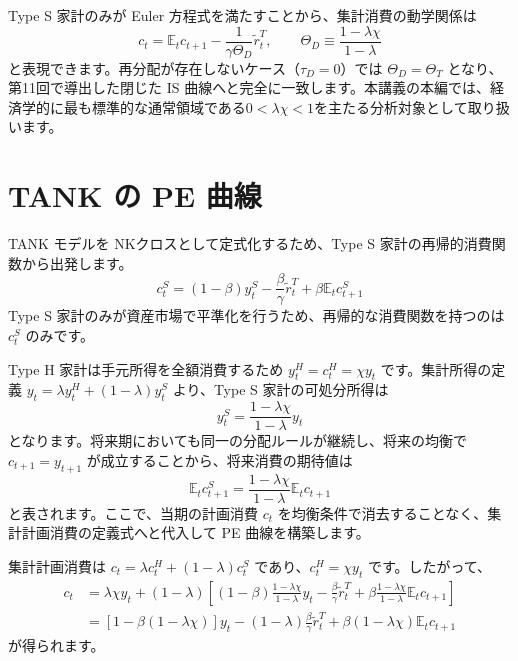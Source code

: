 \documentclass[
  japanese,
  lualatex,
  ja=standard,
  12pt,
  a4paper]{ltjsarticle}
\begin{document}

\begin{tcolorbox}[enhanced jigsaw, arc=.35mm, bottomrule=.15mm, bottomtitle=1mm, breakable, colback=white, colbacktitle=quarto-callout-note-color!10!white, colframe=quarto-callout-note-color-frame, coltitle=black, left=2mm, leftrule=.75mm, opacityback=0, opacitybacktitle=0.6, rightrule=.15mm, title=\textcolor{quarto-callout-note-color}{\faInfo}\hspace{0.5em}{第11回との接続と本編の標準領域}, titlerule=0mm, toprule=.15mm, toptitle=1mm]

Type S 家計のみが Euler 方程式を満たすことから、集計消費の動学関係は \[
c_t = \mathbb{E}_t c_{t+1} - \frac{1}{\gamma \Theta_D}\widetilde{r}_t^T, \qquad \Theta_D \equiv \frac{1 - \lambda\chi}{1-\lambda}
\] と表現できます。再分配が存在しないケース（\(\tau_D = 0\)）では
\(\Theta_D = \Theta_T\) となり、第11回で導出した閉じた IS
曲線へと完全に一致します。本講義の本編では、経済学的に最も標準的な通常領域である\textbf{\(0 < \lambda\chi < 1\)}を主たる分析対象として取り扱います。

\end{tcolorbox}

\section{TANK の PE 曲線}\label{tank-ux306e-pe-ux66f2ux7dda}

TANK モデルを NKクロスとして定式化するため、Type S
家計の再帰的消費関数から出発します。 \[
c_t^S = (1-\beta)y_t^S - \frac{\beta}{\gamma}\widetilde{r}_t^T + \beta \mathbb{E}_t c_{t+1}^S
\] Type S
家計のみが資産市場で平準化を行うため、再帰的な消費関数を持つのは
\(c_t^S\) のみです。

Type H 家計は手元所得を全額消費するため \(y_t^H = c_t^H = \chi y_t\)
です。集計所得の定義 \(y_t = \lambda y_t^H + (1-\lambda)y_t^S\)
より、Type S 家計の可処分所得は \[
y_t^S = \frac{1 - \lambda\chi}{1-\lambda} y_t
\] となります。将来期においても同一の分配ルールが継続し、将来の均衡で
\(c_{t+1} = y_{t+1}\) が成立することから、将来消費の期待値は \[
\mathbb{E}_t c_{t+1}^S = \frac{1 - \lambda\chi}{1-\lambda} \mathbb{E}_t c_{t+1}
\] と表されます。ここで、当期の計画消費 \(c_t\)
を均衡条件で消去することなく、集計計画消費の定義式へと代入して PE
曲線を構築します。

集計計画消費は \(c_t = \lambda c_t^H + (1-\lambda) c_t^S\)
であり、\(c_t^H = \chi y_t\) です。したがって、 \[
\begin{aligned}
c_t
&=
\lambda \chi y_t
+
(1-\lambda)
\left[
(1-\beta)\frac{1 - \lambda\chi}{1-\lambda} y_t
-
\frac{\beta}{\gamma}\widetilde{r}_t^T
+
\beta \frac{1 - \lambda\chi}{1-\lambda} \mathbb{E}_t c_{t+1}
\right]
\\
&=
[1 - \beta(1 - \lambda\chi)] y_t
-
(1-\lambda)\frac{\beta}{\gamma}\widetilde{r}_t^T
+
\beta(1 - \lambda\chi)\mathbb{E}_t c_{t+1}
\end{aligned}
\] が得られます。
\end{document}

